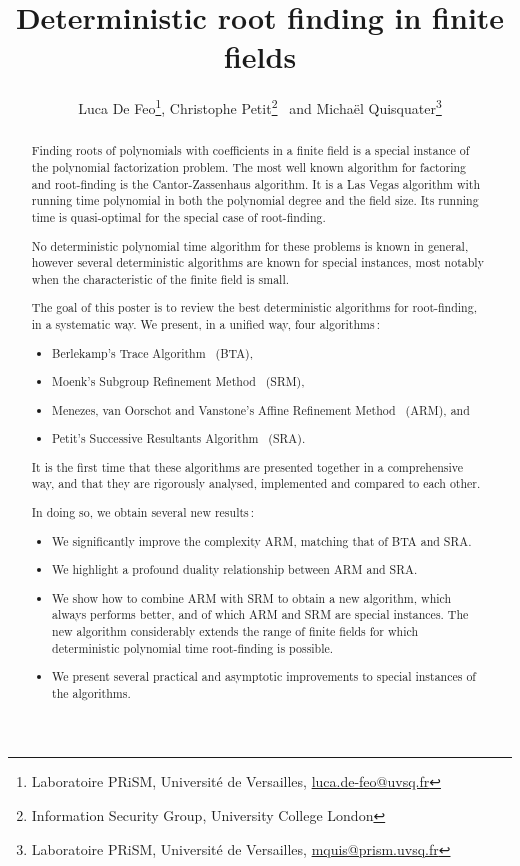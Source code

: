 \documentclass[12pt]{article}
\newcounter{algo}
\begin{document}
\title{Deterministic root finding in finite fields}

\author{
  Luca De Feo\footnote{
    Laboratoire PRiSM,
    Universit\'e de Versailles,
    \url{luca.de-feo@uvsq.fr}},
  Christophe Petit\footnote{
    Information Security Group,
    University College London}~ and
  Micha\"el Quisquater\footnote{
    Laboratoire PRiSM,
    Universit\'e de Versailles,
    \url{mquis@prism.uvsq.fr}}
}

\maketitle
\begin{abstract}
  Finding roots of polynomials with coefficients in a finite field is
  a special instance of the polynomial factorization problem. The most
  well known algorithm for factoring and root-finding is the
  Cantor-Zassenhaus algorithm. It is a Las Vegas algorithm with
  running time polynomial in both the polynomial degree and the field
  size. Its running time is quasi-optimal for the special case of
  root-finding.

  No deterministic polynomial time algorithm for these problems is
  known in general, however several deterministic algorithms are known
  for special instances, most notably when the characteristic of the
  finite field is small.

  The goal of this poster is to review the best deterministic
  algorithms for root-finding, in a systematic way.  We present, in a
  unified way, four algorithms :
  \begin{itemize}
  \item Berlekamp's Trace Algorithm~\cite{berl70} (BTA),
  \item Moenk's Subgroup Refinement Method~\cite{Moenck77} (SRM),
  \item Menezes, van Oorschot and Vanstone's Affine Refinement
    Method~\cite{MenezesOV88,OorschotV89} (ARM), and
  \item Petit's Successive Resultants Algorithm~\cite{cgUCL-P14}
    (SRA).
  \end{itemize}
  It is the first time that these algorithms are presented together in
  a comprehensive way, and that they are rigorously analysed,
  implemented and compared to each other.

  In doing so, we obtain several new results :
  \begin{itemize}
  \item We significantly improve the complexity ARM, matching that of
    BTA and SRA.
  \item We highlight a profound duality relationship between ARM and
    SRA.
  \item We show how to combine ARM with SRM to obtain a new algorithm,
    which always performs better, and of which ARM and SRM are special
    instances. The new algorithm considerably extends the range of
    finite fields for which deterministic polynomial time root-finding
    is possible.
  \item We present several practical and asymptotic improvements to
    special instances of the algorithms.
  \end{itemize}


\end{abstract}
\end{document}
